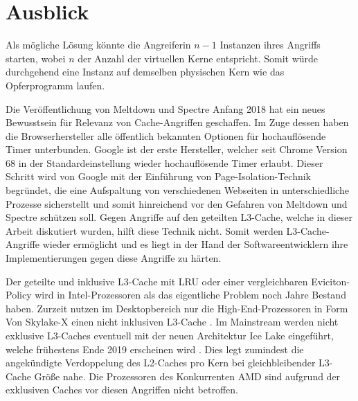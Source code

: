 
\section{Ausblick}

Als mögliche Lösung könnte die Angreiferin $n-1$ Instanzen ihres Angriffs starten, wobei $n$ der Anzahl der virtuellen Kerne entspricht. 
Somit würde durchgehend eine Instanz auf demselben physischen Kern wie das Opferprogramm laufen.

Die Veröffentlichung von Meltdown und Spectre Anfang 2018 hat ein neues Bewusstsein für Relevanz von Cache-Angriffen geschaffen.
Im Zuge dessen haben die Browserhersteller alle öffentlich bekannten Optionen für hochauflösende Timer unterbunden.
Google ist der erste Hersteller, welcher seit Chrome Version 68 in der Standardeinstellung wieder hochauflösende Timer erlaubt.
Dieser Schritt wird von Google mit der Einführung von Page-Isolation-Technik \cite{ChromeSiteIsolation} begründet, die eine Aufspaltung von verschiedenen Webseiten in unterschiedliche Prozesse sicherstellt und somit hinreichend vor den Gefahren von Meltdown und Spectre schützen soll.
Gegen Angriffe auf den geteilten L3-Cache, welche in dieser Arbeit diskutiert wurden, hilft diese Technik nicht.
Somit werden L3-Cache-Angriffe wieder ermöglicht und es liegt in der Hand der Softwareentwicklern ihre Implementierungen gegen diese Angriffe zu härten.

Der geteilte und inklusive L3-Cache mit LRU oder einer vergleichbaren Eviciton-Policy wird in Intel-Prozessoren als das eigentliche Problem noch Jahre Bestand haben.
Zurzeit nutzen im Desktopbereich nur die High-End-Prozessoren in Form Von Skylake-X einen nicht inklusiven L3-Cache \cite{SkylakeXL3Cache}.
Im Mainstream werden nicht exklusive L3-Caches eventuell mit der neuen Architektur Ice Lake eingeführt, welche frühestens Ende 2019 erscheinen wird \cite{IceLakeReleaseDate}.
Dies legt zumindest die angekündigte Verdoppelung des L2-Caches pro Kern bei gleichbleibender L3-Cache Größe nahe.
Die Prozessoren des Konkurrenten AMD sind aufgrund der exklusiven Caches \cite{CacheRyzen} vor diesen Angriffen nicht betroffen.


